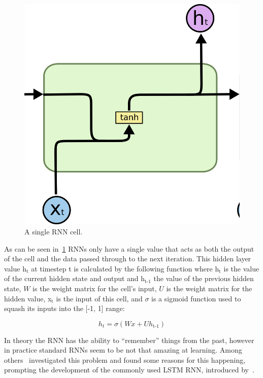 \begin{figure}
	\begin{center}
		\includegraphics[scale=0.5]{rnn/rnn_cell}
	\end{center}
	\caption{A single RNN cell.\label{fig:rnn_cell}}
\end{figure}

As can be seen in~\ref{fig:rnn_cell} RNNs only have a single value that acts as both the output of the cell and the data passed through to the next iteration. This hidden layer value h$_{\text{t}}$ at timestep t is calculated by the following function where h$_{\text{t}}$ is the value of the current hidden state and output and h$_{\text{t-1}}$ the value of the previous hidden state, $W$ is the weight matrix for the cell's input, $U$ is the weight matrix for the hidden value, x$_{\text{t}}$ is the input of this cell, and $\sigma$ is a sigmoid function used to squash its inputs into the [-1, 1] range:

$$ h_t = \sigma(Wx + Uh_\text{t-1}) $$

In theory the RNN has the ability to \enquote{remember} things from the past, however in practice standard RNNs seem to be not that amazing at learning. Among others~\cite{bengio1994learning} investigated this problem and found some reasons for this happening, prompting the development of the commonly used LSTM RNN, introduced by~\cite{hochreiter1997long}\@.

